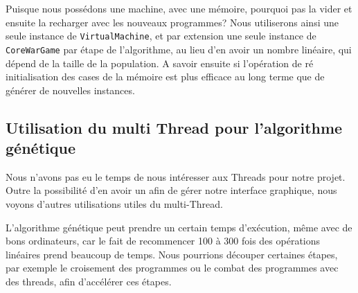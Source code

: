 \documentclass[hidelinks]{report}
\begin{document}
Puisque nous possédons une machine, avec une mémoire, pourquoi pas la vider et ensuite la recharger avec les nouveaux programmes? Nous utiliserons ainsi une seule instance de \texttt{VirtualMachine}, et par extension une seule instance de \texttt{CoreWarGame} par étape de l'algorithme, au lieu d'en avoir un nombre linéaire, qui dépend de la taille de la population. A savoir ensuite si l'opération de ré initialisation des cases de la mémoire est plus efficace au long terme que de générer de nouvelles instances.
\subsection{Utilisation du multi Thread pour l'algorithme génétique}

Nous n'avons pas eu le temps de nous intéresser aux Threads pour notre projet. Outre la possibilité d'en avoir un afin de gérer notre interface graphique, nous voyons d'autres utilisations utiles du multi-Thread.

L'algorithme génétique peut prendre un certain temps d'exécution, même avec de bons ordinateurs, car le fait de recommencer 100 à 300 fois des opérations linéaires prend beaucoup de temps. Nous pourrions découper certaines étapes, par exemple le croisement des programmes ou le combat des programmes avec des threads, afin d'accélérer ces étapes.

\nocite{*}


\end{document}
